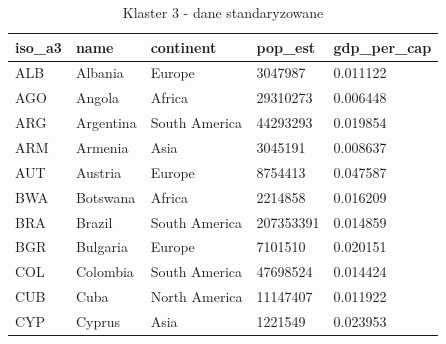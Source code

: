 \documentclass[11pt]{report}
\begin{document}
    \begin{table}[h!]
        \caption {Klaster 3 - dane standaryzowane} \label{tab:cl3std}
        \begin{tabular}{lllll}
            \hline
            \multicolumn{1}{|l|}{iso\_a3} & \multicolumn{1}{l|}{name} & \multicolumn{1}{l|}{continent} & \multicolumn{1}{l|}{pop\_est} & \multicolumn{1}{l|}{gdp\_per\_cap} \\ \hline
            ALB                           & Albania                   & Europe                         & 3047987                       & 0.011122                           \\
            AGO                           & Angola                    & Africa                         & 29310273                      & 0.006448                           \\
            ARG                           & Argentina                 & South America                  & 44293293                      & 0.019854                           \\
            ARM                           & Armenia                   & Asia                           & 3045191                       & 0.008637                           \\
            AUT                           & Austria                   & Europe                         & 8754413                       & 0.047587                           \\
            BWA                           & Botswana                  & Africa                         & 2214858                       & 0.016209                           \\
            BRA                           & Brazil                    & South America                  & 207353391                     & 0.014859                           \\
            BGR                           & Bulgaria                  & Europe                         & 7101510                       & 0.020151                           \\
            COL                           & Colombia                  & South America                  & 47698524                      & 0.014424                           \\
            CUB                           & Cuba                      & North America                  & 11147407                      & 0.011922                           \\
            CYP                           & Cyprus                    & Asia                           & 1221549                       & 0.023953                           \\

\end{tabular}
\end{table}
\end{document}
